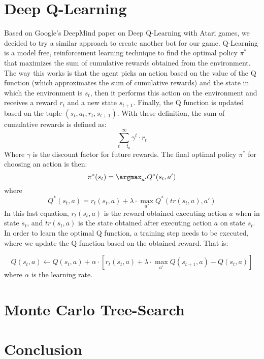 \documentclass{article}
\begin{document}
	\section{Deep Q-Learning}
	Based on Google's DeepMind paper on Deep Q-Learning with Atari games, we decided to try a similar approach to create another bot for our game. Q-Learning  is a model free, reinforcement learning technique to find the optimal policy $\pi^*$ that maximizes the sum of cumulative rewards obtained from the environment. The way this works is that the agent picks an action based on the value of the Q function (which approximates the sum of cumulative rewards) and the state in which the environment is $s_t$, then it performs this action on the environment and receives a reward $r_t$ and a new state $s_{t+1}$. Finally, the Q function is updated based on the tuple $(s_t,a_t,r_t,s_{t+1})$. With these definition, the sum of cumulative rewards is defined as: 
	\begin{equation}
	 \sum_{t=t_0}^\infty\gamma^t\cdot r_t   
	\end{equation}
	Where $\gamma$ is the discount factor for future rewards. The final optimal policy $\pi^*$ for choosing an action is then:
	\begin{equation}
	    \pi^*(s_t) = \argmax_{a'}Q^*(s_t,a')
	\end{equation}
	where
	\begin{equation}
	    Q^*(s_t,a) = r_t(s_t,a) + \lambda \cdot \max_{a'}Q^*(tr(s_t, a), a')
	\end{equation}
	In this last equation, $r_t(s_t,a)$ is the reward obtained executing action $a$ when in state $s_t$, and $tr(s_t, a)$ is the state obtained after executing action $a$ on state $s_t$. In order to learn the optimal Q function, a training step needs to be executed, where we update the Q function based on the obtained reward. That is:
	
	\begin{equation}
	    Q(s_t, a) \leftarrow Q(s_t,a) + \alpha\cdot[r_t(s_t,a)+\lambda\cdot\max_{a'}Q(s_{t+1},a) - Q(s_t,a)]
	\end{equation}
	where $\alpha$ is the learning rate.
	
	
	\section{Monte Carlo Tree-Search}
	
	
	
	\section{Conclusion}
	
	
	
\end{document}
